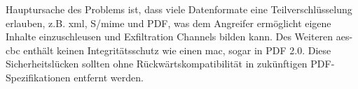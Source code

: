 \par
Hauptursache des Problems ist, dass viele Datenformate eine Teilverschlüsselung erlauben, z.B. \gls{xml}, S/\gls{mime} und PDF, was dem Angreifer ermöglicht eigene Inhalte einzuschleusen und Exfiltration Channels bilden kann. Des Weiteren \gls{aes}-\gls{cbc} enthält keinen Integritätsschutz wie einen \gls{mac}, sogar in PDF 2.0. Diese Sicherheitslücken sollten ohne Rückwärtskompatibilität in zukünftigen PDF-Spezifikationen entfernt werden. \cite{pdfex}

